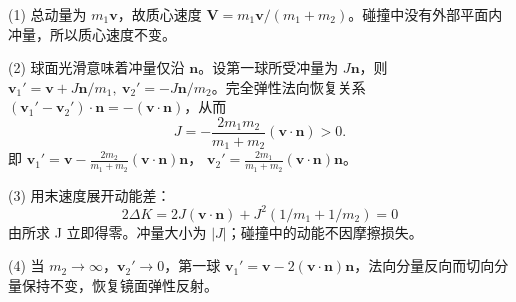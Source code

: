 (1) 总动量为 \(m_1\boldsymbol v\)，故质心速度 \(\boldsymbol V=m_1\boldsymbol v/(m_1+m_2)\)。碰撞中没有外部平面内冲量，所以质心速度不变。

(2) 球面光滑意味着冲量仅沿 \(\boldsymbol n\)。设第一球所受冲量为 \(J\boldsymbol n\)，则 \(\boldsymbol v_1'=\boldsymbol v+J\boldsymbol n/m_1,\ \boldsymbol v_2'=-J\boldsymbol n/m_2\)。完全弹性法向恢复关系 \((\boldsymbol v_1'-\boldsymbol v_2')\cdot\boldsymbol n=-(\boldsymbol v\cdot\boldsymbol n)\)，从而
\[
J=-\frac{2m_1m_2}{m_1+m_2}(\boldsymbol v\cdot\boldsymbol n)>0.
\]
即
\(\boldsymbol v_1'=\boldsymbol v-\frac{2m_2}{m_1+m_2}(\boldsymbol v\cdot\boldsymbol n)\boldsymbol n\)，
\(\boldsymbol v_2'=\frac{2m_1}{m_1+m_2}(\boldsymbol v\cdot\boldsymbol n)\boldsymbol n\)。

(3) 用末速度展开动能差：
\[
2\Delta K=2J(\boldsymbol v\cdot\boldsymbol n)
+J^2(1/m_1+1/m_2)=0
\]
由所求 J 立即得零。冲量大小为 \(|J|\)；碰撞中的动能不因摩擦损失。

(4) 当 \(m_2\to\infty\)，\(\boldsymbol v_2'\to0\)，第一球 \(\boldsymbol v_1'=\boldsymbol v-2(\boldsymbol v\cdot\boldsymbol n)\boldsymbol n\)，法向分量反向而切向分量保持不变，恢复镜面弹性反射。

